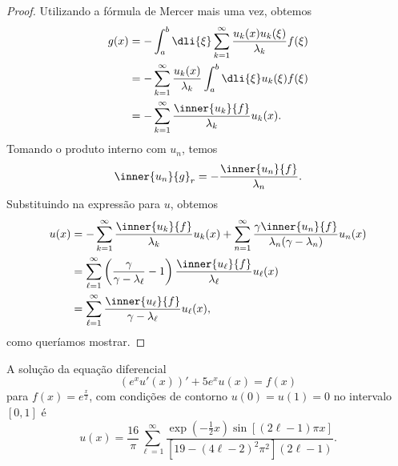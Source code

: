 \begin{proof}
    Utilizando a fórmula de Mercer mais uma vez, obtemos
    \begin{align*}
        g(x) &= -\int_a^b \dli{\xi} \sum_{k = 1}^\infty \frac{u_k(x)u_k(\xi)}{\lambda_k} f(\xi)\\
             &= - \sum_{k = 1}^\infty \frac{u_k(x)}{\lambda_k} \int_{a}^{b}\dli{\xi} u_k(\xi) f(\xi)\\
             &= - \sum_{k = 1}^\infty \frac{\inner{u_k}{f}}{\lambda_k}u_k(x).
    \end{align*}
    Tomando o produto interno com \(u_n\), temos
    \begin{equation*}
        \inner{u_n}{g}_r = -\frac{\inner{u_n}{f}}{\lambda_n}.
    \end{equation*}
    Substituindo na expressão para \(u\), obtemos
    \begin{align*}
        u(x) &= - \sum_{k=1}^\infty \frac{\inner{u_k}{f}}{\lambda_k}u_k(x) + \sum_{n=1}^\infty\frac{\gamma\inner{u_n}{f}}{\lambda_n(\gamma - \lambda_n)}u_n(x)\\
             &= \sum_{\ell = 1}^\infty \left(\frac{\gamma}{\gamma - \lambda_\ell} - 1\right)\frac{\inner{u_\ell}{f}}{\lambda_\ell}u_\ell(x)\\
             &= \sum_{\ell = 1}^\infty \frac{\inner{u_\ell}{f}}{\gamma - \lambda_\ell}u_\ell(x),
    \end{align*}
    como queríamos mostrar.
\end{proof}
\begin{corollary}
    A solução da equação diferencial
    \begin{equation*}
        (e^xu'(x))' + 5e^x u(x) = f(x)
    \end{equation*}
    para \(f(x) = e^{\frac{x}{2}}\), com condições de contorno \(u(0) = u(1) = 0\) no intervalo \([0,1]\) é
    \begin{equation*}
        u(x)  = \frac{16}{\pi} \sum_{\ell = 1}^\infty \frac{\exp\left(-\frac12x\right)\sin\left[(2\ell - 1)\pi x\right]}{[19 - (4\ell - 2)^2\pi^2](2\ell - 1)}.
    \end{equation*}
\end{corollary}
